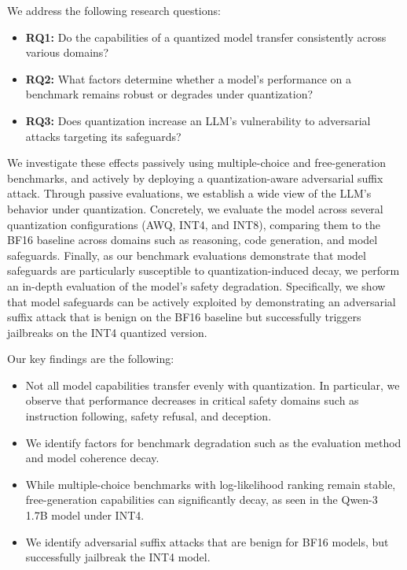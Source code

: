 \documentclass{article}
\begin{document}
We address the following research questions:  
\begin{itemize}
    \item \textbf{RQ1:} Do the capabilities of a quantized model transfer consistently across various domains?
    \item \textbf{RQ2:} What factors determine whether a model's performance on a benchmark remains robust or degrades under quantization?
    \item \textbf{RQ3:} Does quantization increase an LLM's vulnerability to adversarial attacks targeting its safeguards?
\end{itemize}

We investigate these effects passively using multiple-choice and free-generation benchmarks,
and actively by deploying a quantization-aware adversarial suffix attack.
Through passive evaluations, we establish a wide view of the LLM's behavior under quantization.
Concretely, we evaluate the model across several quantization configurations (AWQ, INT4, and INT8),
comparing them to the BF16 baseline across domains such as reasoning, code generation, 
and model safeguards.
Finally, as our benchmark evaluations demonstrate that model safeguards are particularly
 susceptible to quantization-induced decay, we perform an in-depth evaluation of the model's safety degradation.
Specifically, we show that model safeguards can be actively exploited by demonstrating an adversarial suffix attack that
is benign on the BF16 baseline but successfully triggers jailbreaks on the INT4 quantized version. 
 \par

Our key findings are the following:
\begin{itemize}
	\item Not all model capabilities transfer evenly with quantization. In particular, we observe that performance decreases in critical safety domains such as instruction following, safety refusal, and deception.
	\item We identify factors for benchmark degradation such as the evaluation method and model coherence decay. 
	\item While multiple-choice benchmarks with log-likelihood ranking remain stable, free-generation capabilities can significantly decay, as seen in the Qwen-3 1.7B model under INT4.
	\item We identify adversarial suffix attacks that are benign for BF16 models, but successfully jailbreak the INT4 model. 
\end{itemize}
\end{document}
